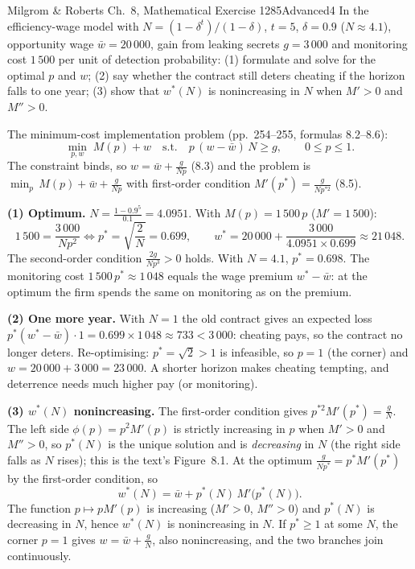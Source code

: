 \begin{exsol}{Milgrom \& Roberts Ch.~8, Mathematical Exercise 1}{285}{Advanced}{4}
\asked In the efficiency-wage model with $N = (1 - \delta^t)/(1-\delta)$, $t = 5$, $\delta = 0.9$ ($N \approx
4.1$), opportunity wage $\bar w = 20\,000$, gain from leaking secrets $g = 3\,000$ and monitoring cost $1\,500$ per
unit of detection probability: (1) formulate and solve for the optimal $p$ and $w$; (2) say whether the contract
still deters cheating if the horizon falls to one year; (3) show that $w^*(N)$ is nonincreasing in $N$ when $M' > 0$
and $M'' > 0$.

\method The minimum-cost implementation problem (pp.~254--255, formulas 8.2--8.6):
\[
  \min_{p,w}\; M(p) + w \quad\text{s.t.}\quad p\,(w - \bar w)\,N \ge g, \qquad 0 \le p \le 1 .
\]
The constraint binds, so $w = \bar w + \frac{g}{Np}$ (8.3) and the problem is $\min_p\, M(p) + \bar w + \frac{g}{Np}$
with first-order condition $M'(p^*) = \frac{g}{N p^{*2}}$ (8.5).

\solution
\textbf{(1) Optimum.} $N = \frac{1 - 0.9^5}{0.1} = 4.0951$. With $M(p) = 1\,500\,p$ ($M' = 1\,500$):
\[
  1\,500 = \frac{3\,000}{N p^2} \iff p^* = \sqrt{\frac{2}{N}} = 0.699, \qquad
  w^* = 20\,000 + \frac{3\,000}{4.0951 \times 0.699} \approx 21\,048 .
\]
The second-order condition $\frac{2g}{Np^3} > 0$ holds. With $N = 4.1$, $p^* = 0.698$. The monitoring cost
$1\,500\,p^* \approx 1\,048$ equals the wage premium $w^* - \bar w$: at the optimum the firm spends the same on
monitoring as on the premium.

\textbf{(2) One more year.} With $N = 1$ the old contract gives an expected loss $p^*(w^* - \bar w)\cdot 1 = 0.699 \times
1\,048 \approx 733 < 3\,000$: cheating pays, so the contract no longer deters. Re-optimising: $p^* = \sqrt{2} > 1$
is infeasible, so $p = 1$ (the corner) and $w = 20\,000 + 3\,000 = 23\,000$. A shorter horizon makes cheating tempting, and
deterrence needs much higher pay (or monitoring).

\textbf{(3) $w^*(N)$ nonincreasing.} The first-order condition gives $p^{*2}M'(p^*) = \frac gN$. The left side
$\phi(p) = p^2M'(p)$ is strictly increasing in $p$ when $M' > 0$ and $M'' > 0$, so $p^*(N)$ is the unique solution
and is \emph{decreasing} in $N$ (the right side falls as $N$ rises); this is the text's Figure~8.1. At the optimum
$\frac{g}{Np^*} = p^*M'(p^*)$ by the first-order condition, so
\[
  w^*(N) = \bar w + p^*(N)\,M'\bigl(p^*(N)\bigr) .
\]
The function $p \mapsto pM'(p)$ is increasing ($M' > 0$, $M'' > 0$) and $p^*(N)$ is decreasing in $N$, hence
$w^*(N)$ is nonincreasing in $N$. If $p^* \ge 1$ at some $N$, the corner $p = 1$ gives $w = \bar w + \frac gN$, also
nonincreasing, and the two branches join continuously.


\end{exsol}
